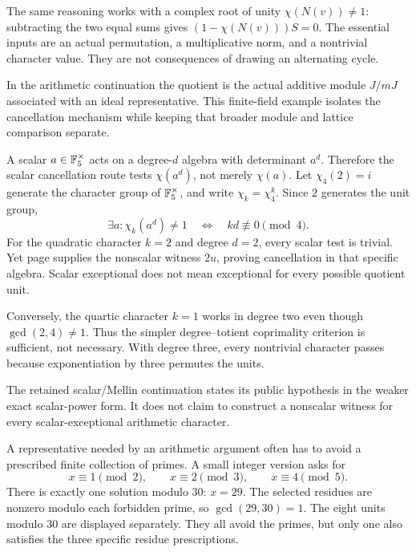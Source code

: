The same reasoning works with a complex root of unity $\chi(N(v))\ne1$: subtracting the two equal sums gives $(1-\chi(N(v)))S=0$. The essential inputs are an actual permutation, a multiplicative norm, and a nontrivial character value. They are not consequences of drawing an alternating cycle.

In the arithmetic continuation the quotient is the actual additive module $J/mJ$ associated with an ideal representative. This finite-field example isolates the cancellation mechanism while keeping that broader module and lattice comparison separate.

A scalar $a\in\mathbb F_5^\times$ acts on a degree-$d$ algebra with determinant $a^d$. Therefore the scalar cancellation route tests $\chi(a^d)$, not merely $\chi(a)$.
Let $\chi_4(2)=i$ generate the character group of $\mathbb F_5^\times$, and write $\chi_k=\chi_4^k$. Since $2$ generates the unit group,
\[
\exists a:\chi_k(a^d)\ne1
\quad\Longleftrightarrow\quad kd\not\equiv0\pmod4.
\]
For the quadratic character $k=2$ and degree $d=2$, every scalar test is trivial. Yet page  supplies the nonscalar witness $2u$, proving cancellation in that specific algebra. Scalar exceptional does not mean exceptional for every possible quotient unit.

Conversely, the quartic character $k=1$ works in degree two even though $\gcd(2,4)\ne1$. Thus the simpler degree--totient coprimality criterion is sufficient, not necessary. With degree three, every nontrivial character passes because exponentiation by three permutes the units.

The retained scalar/Mellin continuation states its public hypothesis in the weaker exact scalar-power form. It does not claim to construct a nonscalar witness for every scalar-exceptional arithmetic character.

A representative needed by an arithmetic argument often has to avoid a prescribed finite collection of primes. A small integer version asks for
\[
x\equiv1\pmod2,\qquad x\equiv2\pmod3,\qquad x\equiv4\pmod5.
\]
There is exactly one solution modulo 30: $x=29$.
The selected residues are nonzero modulo each forbidden prime, so $\gcd(29,30)=1$. The eight units modulo 30 are displayed separately. They all avoid the primes, but only one also satisfies the three specific residue prescriptions.


